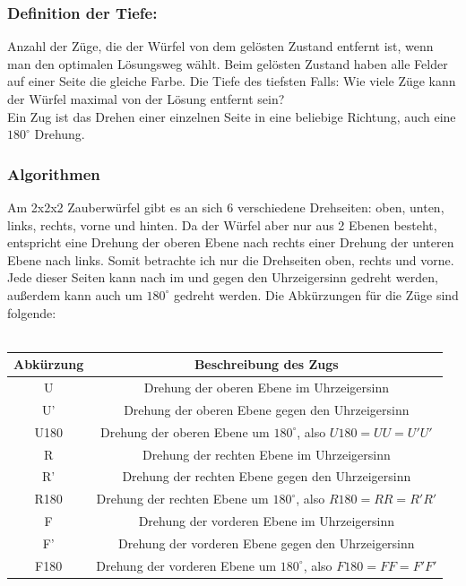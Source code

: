 \documentclass[12pt,a4paper, usenames, dvipsnames]{scrartcl}
\begin{document}
\subsubsection*{Definition der Tiefe:}
Anzahl der Züge, die der Würfel von dem gelösten Zustand entfernt ist, wenn man den optimalen Lösungsweg wählt. Beim gelösten Zustand haben alle Felder auf einer Seite die gleiche Farbe. Die Tiefe des tiefsten Falls: Wie viele Züge kann der Würfel maximal von der Lösung entfernt sein? \\
Ein Zug ist das Drehen einer einzelnen Seite in eine beliebige Richtung, auch eine $180^\circ$ Drehung.

\subsubsection*{Algorithmen}
Am 2x2x2 Zauberwürfel gibt es an sich 6 verschiedene Drehseiten: oben, unten, links, rechts, vorne und hinten. Da der Würfel aber nur aus 2 Ebenen besteht, entspricht eine Drehung der oberen Ebene nach rechts einer Drehung der unteren Ebene nach links. Somit betrachte ich nur die Drehseiten oben, rechts und vorne. \\
Jede dieser Seiten kann nach im und gegen den Uhrzeigersinn gedreht werden, außerdem kann auch um $180^\circ$ gedreht werden. Die Abkürzungen für die Züge sind folgende: \\
\\
\begin{tabular}{|c|c|}
\hline
Abkürzung & Beschreibung des Zugs \\
\hline
\hline
U & Drehung der oberen Ebene im Uhrzeigersinn \\
\hline
U' & Drehung der oberen Ebene gegen den Uhrzeigersinn \\
\hline
U180 & Drehung der oberen Ebene um $180^\circ$, also $U180= UU = U'U'$ \\
\hline
R & Drehung der rechten Ebene im Uhrzeigersinn \\
\hline
R' & Drehung der rechten Ebene gegen den Uhrzeigersinn \\
\hline
R180 & Drehung der rechten Ebene um $180^\circ$, also $R180= RR = R'R'$ \\
\hline
F & Drehung der vorderen Ebene im Uhrzeigersinn \\
\hline
F' & Drehung der vorderen Ebene gegen den Uhrzeigersinn \\
\hline
F180 & Drehung der vorderen Ebene um $180^\circ$, also $F180= FF = F'F'$ \\
\hline
\end{tabular}
\end{document}
